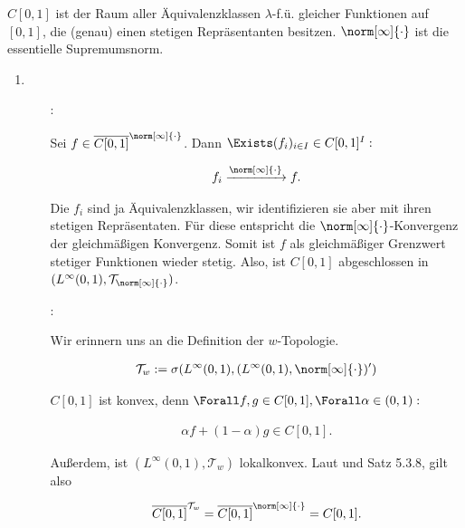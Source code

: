 \begin{solution}

$C[0, 1]$ ist der Raum aller Äquivalenzklassen $\lambda$-f.ü. gleicher Funktionen auf $[0, 1]$, die (genau) einen stetigen Repräsentanten besitzen.
$\norm[\infty]{\cdot}$ ist die essentielle Supremumsnorm.

\begin{enumerate}[label = \alph*)]

  \item
  \phantom{}

  \begin{itemize}

    \item
    [\Quote{$\norm[\infty]{\cdot}$}:]

    Sei $f \in \overline{C[0, 1]}^{\norm[\infty]{\cdot}}$.
    Dann $\Exists (f_i)_{i \in I} \in C[0, 1]^I:$

    \begin{align*}
      f_i \xrightarrow{\norm[\infty]{\cdot}} f.
    \end{align*}

    Die $f_i$ sind ja Äquivalenzklassen, wir identifizieren sie aber mit ihren stetigen Repräsentaten.
    Für diese entspricht die $\norm[\infty]{\cdot}$-Konvergenz der gleichmäßigen Konvergenz.
    Somit ist $f$ als gleichmäßiger Grenzwert stetiger Funktionen wieder stetig.
    Also, ist $C[0, 1]$ abgeschlossen in $(L^\infty(0, 1), \mathcal{T}_{\norm[\infty]{\cdot}})$.

    \item
    [\Quote{$w$}:]

    Wir erinnern uns an die Definition der $w$-Topologie.

    \begin{align*}
      \mathcal{T}_w
      :=
      \sigma
      (
        L^\infty(0,1),
        (L^\infty(0,1), \norm[\infty]{\cdot})^\prime
      )
    \end{align*}

    $C[0, 1]$ ist konvex, denn $\Forall f, g \in C[0, 1], \Forall \alpha \in (0, 1):$

    \begin{align*}
      \alpha f + (1 - \alpha) g \in C[0, 1].
    \end{align*}

    Außerdem, ist $(L^\infty(0, 1), \mathcal{T}_w)$ lokalkonvex.
    Laut \Quote{$\norm[\infty]{\cdot}$} und Satz 5.3.8, gilt also

    \begin{align*}
      \overline{C[0,1]}^{\mathcal{T}_w}
      =
      \overline{C[0,1]}^{\norm[\infty]{\cdot}}
      =
      C[0, 1].
    \end{align*}


\end{itemize}
\end{enumerate}
\end{solution}
